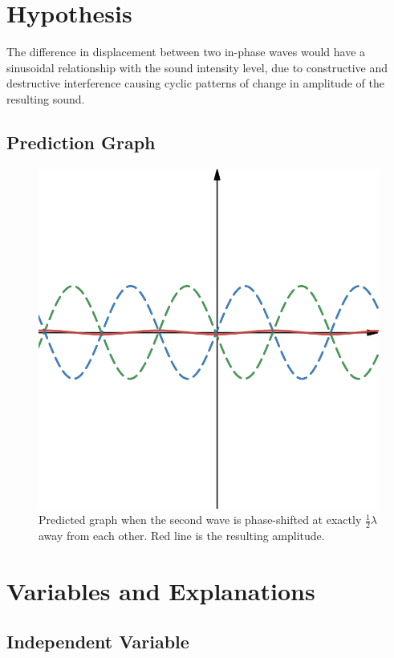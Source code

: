 \documentclass[index]{subfiles}
\begin{document}
\section{Hypothesis}

The difference in displacement between two in-phase waves would have a sinusoidal relationship with the sound intensity level, due to constructive and destructive interference causing cyclic patterns of change in amplitude of the resulting sound.

\subsection{Prediction Graph}

\begin{figure}[H]
    \centering
    \includegraphics[scale=0.3]{prediction.png}
    \caption{Predicted graph when the second wave is phase-shifted at exactly \(\frac{1}{2}\lambda\) away from each other. Red line is the resulting amplitude.}
\end{figure}

\section{Variables and Explanations}

\subsection{Independent Variable}
\end{document}
